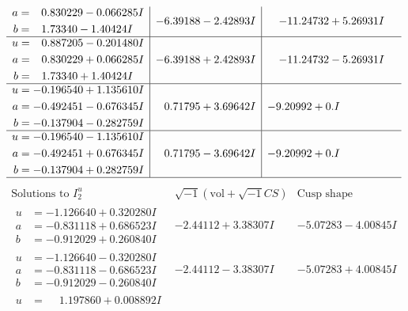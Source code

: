 \documentclass[1p]{elsarticle_modified}
\theoremstyle{definition}
\newcommand{\I}{\sqrt{-1}}
\begin{document}
$$\begin{array}{c|c|c}
\begin{aligned}
a &= \phantom{-}0.830229 - 0.066285 I \\
b &= \phantom{-}1.73340 - 1.40424 I\end{aligned}
 & -6.39188 - 2.42893 I & -11.24732 + 5.26931 I \\ \hline\begin{aligned}
u &= \phantom{-}0.887205 - 0.201480 I \\
a &= \phantom{-}0.830229 + 0.066285 I \\
b &= \phantom{-}1.73340 + 1.40424 I\end{aligned}
 & -6.39188 + 2.42893 I & -11.24732 - 5.26931 I \\ \hline\begin{aligned}
u &= -0.196540 + 1.135610 I \\
a &= -0.492451 - 0.676345 I \\
b &= -0.137904 - 0.282759 I\end{aligned}
 & \phantom{-}0.71795 + 3.69642 I & -9.20992 + 0. I\phantom{ +0.000000I} \\ \hline\begin{aligned}
u &= -0.196540 - 1.135610 I \\
a &= -0.492451 + 0.676345 I \\
b &= -0.137904 + 0.282759 I\end{aligned}
 & \phantom{-}0.71795 - 3.69642 I & -9.20992 + 0. I\phantom{ +0.000000I}\\
 \hline 
 \end{array}$$\newpage$$\begin{array}{c|c|c}  
\text{Solutions to }I^u_{2}& \I (\text{vol} + \sqrt{-1}CS) & \text{Cusp shape}\\
 \hline 
\begin{aligned}
u &= -1.126640 + 0.320280 I \\
a &= -0.831118 + 0.686523 I \\
b &= -0.912029 + 0.260840 I\end{aligned}
 & -2.44112 + 3.38307 I & -5.07283 - 4.00845 I \\ \hline\begin{aligned}
u &= -1.126640 - 0.320280 I \\
a &= -0.831118 - 0.686523 I \\
b &= -0.912029 - 0.260840 I\end{aligned}
 & -2.44112 - 3.38307 I & -5.07283 + 4.00845 I \\ \hline\begin{aligned}
u &= \phantom{-}1.197860 + 0.008892 I \\

\end{aligned}
\end{array}$$
\end{document}
